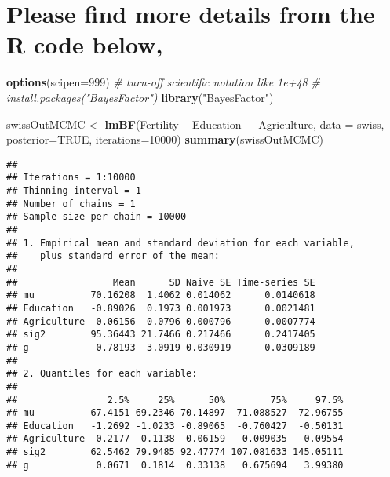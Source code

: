 \documentclass[]{article}
\newenvironment{Shaded}{\begin{snugshade}}{\end{snugshade}}
\newcommand{\CommentTok}[1]{\textcolor[rgb]{0.56,0.35,0.01}{\textit{#1}}}
\newcommand{\DataTypeTok}[1]{\textcolor[rgb]{0.13,0.29,0.53}{#1}}
\newcommand{\DecValTok}[1]{\textcolor[rgb]{0.00,0.00,0.81}{#1}}
\newcommand{\KeywordTok}[1]{\textcolor[rgb]{0.13,0.29,0.53}{\textbf{#1}}}
\newcommand{\NormalTok}[1]{#1}
\newcommand{\OperatorTok}[1]{\textcolor[rgb]{0.81,0.36,0.00}{\textbf{#1}}}
\newcommand{\OtherTok}[1]{\textcolor[rgb]{0.56,0.35,0.01}{#1}}
\newcommand{\StringTok}[1]{\textcolor[rgb]{0.31,0.60,0.02}{#1}}
\begin{document}
\hypertarget{please-find-more-details-from-the-r-code-below-4}{%
\section{Please find more details from the R code
below,}\label{please-find-more-details-from-the-r-code-below-4}}

\begin{Shaded}
\begin{Highlighting}[]
\KeywordTok{options}\NormalTok{(}\DataTypeTok{scipen=}\DecValTok{999}\NormalTok{)  }\CommentTok{# turn-off scientific notation like 1e+48}
\CommentTok{# install.packages("BayesFactor")}
\KeywordTok{library}\NormalTok{(}\StringTok{"BayesFactor"}\NormalTok{)}

\NormalTok{swissOutMCMC <-}\StringTok{ }\KeywordTok{lmBF}\NormalTok{(Fertility }\OperatorTok{~}\StringTok{ }\NormalTok{Education }\OperatorTok{+}\StringTok{ }\NormalTok{Agriculture, }\DataTypeTok{data =}\NormalTok{ swiss, }\DataTypeTok{posterior=}\OtherTok{TRUE}\NormalTok{, }\DataTypeTok{iterations=}\DecValTok{10000}\NormalTok{)}
\KeywordTok{summary}\NormalTok{(swissOutMCMC)}
\end{Highlighting}
\end{Shaded}

\begin{verbatim}
## 
## Iterations = 1:10000
## Thinning interval = 1 
## Number of chains = 1 
## Sample size per chain = 10000 
## 
## 1. Empirical mean and standard deviation for each variable,
##    plus standard error of the mean:
## 
##                 Mean      SD Naive SE Time-series SE
## mu          70.16208  1.4062 0.014062      0.0140618
## Education   -0.89026  0.1973 0.001973      0.0021481
## Agriculture -0.06156  0.0796 0.000796      0.0007774
## sig2        95.36443 21.7466 0.217466      0.2417405
## g            0.78193  3.0919 0.030919      0.0309189
## 
## 2. Quantiles for each variable:
## 
##                2.5%     25%      50%        75%     97.5%
## mu          67.4151 69.2346 70.14897  71.088527  72.96755
## Education   -1.2692 -1.0233 -0.89065  -0.760427  -0.50131
## Agriculture -0.2177 -0.1138 -0.06159  -0.009035   0.09554
## sig2        62.5462 79.9485 92.47774 107.081633 145.05111
## g            0.0671  0.1814  0.33138   0.675694   3.99380
\end{verbatim}

\begin{Shaded}
\end{Shaded}
\end{document}
